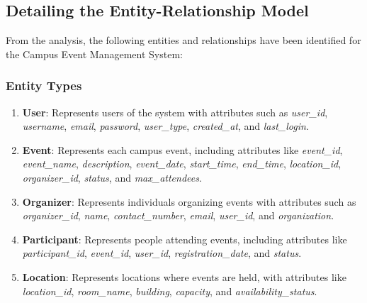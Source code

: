 \subsection{Detailing the Entity-Relationship Model}

From the analysis, the following entities and relationships have been identified for the Campus Event Management System:

\subsubsection{Entity Types}

\begin{enumerate}
    \item \textbf{User}: Represents users of the system with attributes such as \textit{user\_id}, \textit{username}, \textit{email}, \textit{password}, \textit{user\_type}, \textit{created\_at}, and \textit{last\_login}.
    \item \textbf{Event}: Represents each campus event, including attributes like \textit{event\_id}, \textit{event\_name}, \textit{description}, \textit{event\_date}, \textit{start\_time}, \textit{end\_time}, \textit{location\_id}, \textit{organizer\_id}, \textit{status}, and \textit{max\_attendees}.
    \item \textbf{Organizer}: Represents individuals organizing events with attributes such as \textit{organizer\_id}, \textit{name}, \textit{contact\_number}, \textit{email}, \textit{user\_id}, and \textit{organization}.
    \item \textbf{Participant}: Represents people attending events, including attributes like \textit{participant\_id}, \textit{event\_id}, \textit{user\_id}, \textit{registration\_date}, and \textit{status}.
    \item \textbf{Location}: Represents locations where events are held, with attributes like \textit{location\_id}, \textit{room\_name}, \textit{building}, \textit{capacity}, and \textit{availability\_status}.
\end{enumerate}

